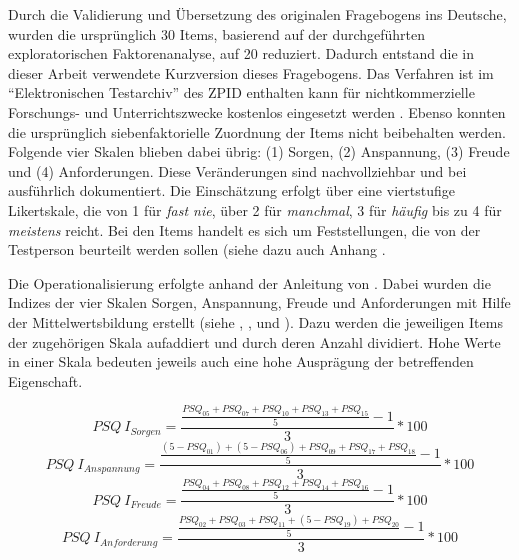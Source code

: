 Durch die Validierung und Übersetzung des originalen Fragebogens ins Deutsche, wurden die ursprünglich 30 Items, basierend auf der durchgeführten exploratorischen Faktorenanalyse, auf 20 reduziert. Dadurch entstand die in dieser Arbeit verwendete Kurzversion dieses Fragebogens. Das Verfahren ist im \enquote{Elektronischen Testarchiv} des ZPID enthalten kann für nichtkommerzielle Forschungs- und Unterrichtszwecke kostenlos eingesetzt werden \cite{ZPID}. Ebenso konnten die ursprünglich siebenfaktorielle Zuordnung der Items nicht beibehalten werden. Folgende vier Skalen blieben dabei übrig: (1) Sorgen, (2) Anspannung, (3) Freude und (4) Anforderungen. Diese Veränderungen sind nachvollziehbar und bei  ausführlich dokumentiert. Die Einschätzung erfolgt über eine viertstufige Likertskale, die von 1 für \textit{fast nie}, über 2 für \textit{manchmal}, 3 für \textit{häufig} bis zu 4 für \textit{meistens} reicht. Bei den Items handelt es sich um Feststellungen, die von der Testperson beurteilt werden sollen (siehe dazu auch Anhang . 

Die Operationalisierung erfolgte anhand der Anleitung von . Dabei wurden die Indizes der vier Skalen Sorgen, Anspannung, Freude und Anforderungen mit Hilfe der Mittelwertsbildung erstellt (siehe , ,  und ). Dazu werden die jeweiligen Items der zugehörigen Skala aufaddiert und durch deren Anzahl dividiert. Hohe Werte in einer Skala bedeuten jeweils auch eine hohe Ausprägung der betreffenden Eigenschaft.

\begin{equation}\label{eq:PSQIndexSorgen}
    PSQ~I_{Sorgen}=\frac{\frac{PSQ_{05}+PSQ_{07}+PSQ_{10}+PSQ_{13}+PSQ_{15}}{5}-1}{3}*100
\end{equation}
\begin{equation}\label{eq:PSQIndexAnspannung}
    PSQ~I_{Anspannung}=\frac{\frac{(5-PSQ_{01})+(5-PSQ_{06})+PSQ_{09}+PSQ_{17}+PSQ_{18}}{5}-1}{3}*100
\end{equation}
\begin{equation}\label{eq:PSQIndexFreude}
    PSQ~I_{Freude}=\frac{\frac{PSQ_{04}+PSQ_{08}+PSQ_{12}+PSQ_{14}+PSQ_{16}}{5}-1}{3}*100
\end{equation}
\begin{equation}\label{eq:PSQIndexAnforderung}
    PSQ~I_{Anforderung}=\frac{\frac{PSQ_{02}+PSQ_{03}+PSQ_{11}+(5-PSQ_{19})+PSQ_{20}}{5}-1}{3}*100
\end{equation}

